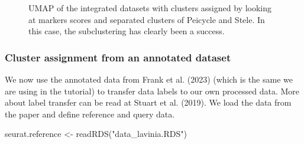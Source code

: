 \documentclass[
  letterpaper,
  DIV=11,
  numbers=noendperiod]{scrartcl}
\newenvironment{Shaded}{}{}
\newcommand{\FunctionTok}[1]{\textcolor[rgb]{0.02,0.16,0.49}{#1}}
\newcommand{\NormalTok}[1]{#1}
\newcommand{\OtherTok}[1]{\textcolor[rgb]{0.00,0.44,0.13}{#1}}
\newcommand{\StringTok}[1]{\textcolor[rgb]{0.25,0.44,0.63}{#1}}
\begin{document}
\begin{figure}[H]


\caption{\label{fig-umapsubcluster}UMAP of the integrated datasets with
clusters assigned by looking at markers scores and separated clusters of
Peicycle and Stele. In this case, the subclustering has clearly been a
success.}

\end{figure}%

\subsubsection{Cluster assignment from an annotated
dataset}\label{cluster-assignment-from-an-annotated-dataset}

We now use the annotated data from Frank et al. (2023) (which is the
same we are using in the tutorial) to transfer data labels to our own
processed data. More about label transfer can be read at Stuart et al.
(2019). We load the data from the paper and define reference and query
data.

\begin{Shaded}
\begin{Highlighting}[]
\NormalTok{seurat.reference }\OtherTok{\textless{}{-}} \FunctionTok{readRDS}\NormalTok{(}\StringTok{"data\_lavinia.RDS"}\NormalTok{)}
\end{Highlighting}
\end{Shaded}
\end{document}
